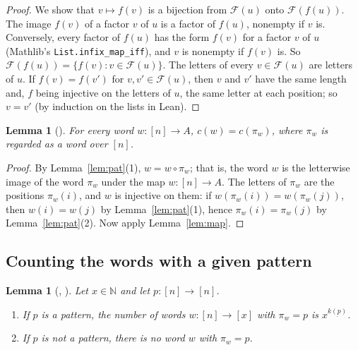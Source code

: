 \documentclass[11pt]{amsart}
\theoremstyle{plain}
\newtheorem{lemma}[theorem]{Lemma}
\theoremstyle{definition}
\newcommand{\N}{\mathbb{N}}
\newcommand{\Fac}{\mathcal{F}}
\newcommand{\ff}[2]{#1^{\underline{#2}}}
\begin{document}
\begin{proof}
We show that $v\mapsto f(v)$ is a bijection from $\Fac(u)$ onto $\Fac(f(u))$. The image $f(v)$ of a factor $v$ of $u$ is a factor of $f(u)$, nonempty if $v$ is. Conversely, every factor of $f(u)$ has the form $f(v)$ for a factor $v$ of $u$ (Mathlib's \texttt{List.infix\_map\_iff}), and $v$ is nonempty if $f(v)$ is. So $\Fac(f(u))=\{f(v):v\in\Fac(u)\}$. The letters of every $v\in\Fac(u)$ are letters of $u$. If $f(v)=f(v')$ for $v,v'\in\Fac(u)$, then $v$ and $v'$ have the same length and, $f$ being injective on the letters of $u$, the same letter at each position; so $v=v'$ (by induction on the lists in Lean).
\end{proof}

\begin{lemma}[]\label{lem:cpat}
For every word $w\colon[n]\to A$, $c(w)=c(\pi_w)$, where $\pi_w$ is regarded as a word over $[n]$.
\end{lemma}

\begin{proof}
By Lemma~\ref{lem:pat}(1), $w=w\circ\pi_w$; that is, the word $w$ is the letterwise image of the word $\pi_w$ under the map $w\colon[n]\to A$. The letters of $\pi_w$ are the positions $\pi_w(i)$, and $w$ is injective on them: if $w(\pi_w(i))=w(\pi_w(j))$, then $w(i)=w(j)$ by Lemma~\ref{lem:pat}(1), hence $\pi_w(i)=\pi_w(j)$ by Lemma~\ref{lem:pat}(2). Now apply Lemma~\ref{lem:map}.
\end{proof}

\subsection{Counting the words with a given pattern}

\begin{lemma}[, ]\label{lem:fiber}
Let $x\in\N$ and let $p\colon[n]\to[n]$.
\begin{enumerate}
\item If $p$ is a pattern, the number of words $w\colon[n]\to[x]$ with $\pi_w=p$ is $\ff x{k(p)}$.
\item If $p$ is not a pattern, there is no word $w$ with $\pi_w=p$.
\end{enumerate}
\end{lemma}
\end{document}
